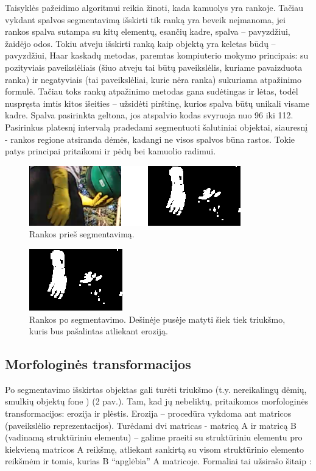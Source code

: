 \documentclass{VUMIFPSkursinis}
\begin{document}
Taisyklės pažeidimo algoritmui reikia žinoti, kada kamuolys yra rankoje. Tačiau vykdant spalvos segmentavimą išskirti tik ranką yra beveik neįmanoma, jei rankos spalva sutampa su kitų elementų, esančių kadre, spalva – pavyzdžiui, žaidėjo odos. Tokiu atveju išskirti ranką kaip objektą yra keletas būdų – pavyzdžiui, Haar kaskadų metodas, paremtas kompiuterio mokymo principais: su pozityviais paveikslėliais (šiuo atveju tai būtų paveikslėlis, kuriame pavaizduota ranka) ir negatyviais (tai paveikslėliai, kurie nėra ranka) sukuriama atpažinimo formulė. \cite{HaarCascades}  Tačiau toks rankų atpažinimo metodas gana sudėtingas ir lėtas, todėl nuspręsta imtis kitos išeities – užsidėti pirštinę, kurios spalva būtų unikali visame kadre. Spalva pasirinkta geltona, jos atspalvio kodas svyruoja nuo 96 iki 112. Pasirinkus platesnį intervalą pradedami segmentuoti šalutiniai objektai, siauresnį - rankos regione atsiranda dėmės, kadangi ne visos spalvos būna rastos. Tokie patys principai pritaikomi ir pėdų bei kamuolio radimui.
\begin{figure}[H]
	\centering
	\includegraphics[scale=1]{imgs/rank}
	\caption{Rankos prieš segmentavimą.}
	\label{imgs:rank}
\end{figure}
\begin{figure}[H]
	\centering
	\includegraphics[scale=1]{imgs/segrank}
	\caption{Rankos po segmentavimo. Dešinėje pusėje matyti šiek tiek triukšmo, kuris bus pašalintas atliekant eroziją.}
	\label{imgs:segrank}
\end{figure}
\subsection{Morfologinės transformacijos}
Po segmentavimo išskirtas objektas gali turėti triukšmo (t.y. nereikalingų dėmių, smulkių objektų fone ) (2 pav.). Tam, kad jų nebeliktų, pritaikomos morfologinės transformacijos: erozija ir plėstis. Erozija – procedūra vykdoma ant matricos (paveikslėlio reprezentacijos). Turėdami dvi matricas -  matricą A ir matricą B (vadinamą struktūriniu elementu) – galime praeiti su struktūriniu elementu pro kiekvieną matricos A reikšmę, atliekant sankirtą su visom struktūrinio elemento reikšmėm ir tomis, kurias B “apglėbia” A matricoje. Formaliai tai užsirašo šitaip \cite{ImageAnalysisMorph}:
\end{document}
